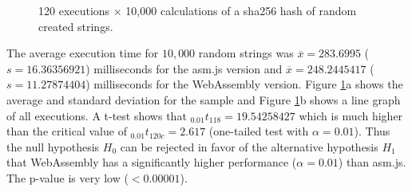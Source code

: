 \begin{figure}[!h]%
\centering
{}%
{}%
\caption{120 executions $\times$ 10,000 calculations of a sha256 hash of random created strings.}%
\label{sha256-hash-10000-1}%
\end{figure}
    
The average execution time for $10,000$ random strings was $\overline{x}=283.6995$ ($s=16.36356921$) milliseconds for the asm.js version and $\overline{x}=248.2445417$ ($s=11.27874404$) milliseconds for the WebAssembly version. Figure \ref{sha256-hash-10000-1}a shows the average and standard deviation for the sample and Figure \ref{sha256-hash-10000-1}b shows a line graph of all executions. A t-test shows that $_{0.01}t_{118}=19.54258427$ which is much higher than the critical value of $_{0.01}t_{120c}=2.617$ (one-tailed test with $\alpha = 0.01$). Thus the null hypothesis $H_{0}$ can be rejected in favor of the alternative hypothesis $H_{1}$ that WebAssembly has a significantly higher performance ($\alpha = 0.01$) than asm.js. The p-value is very low ($<0.00001$).


